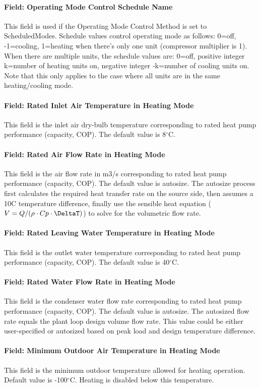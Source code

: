 \paragraph{Field: Operating Mode Control Schedule Name} This field is used if
the Operating Mode Control Method is set to ScheduledModes. Schedule values
control operating mode as follows: 0=off, -1=cooling, 1=heating when there's
only one unit (compressor multiplier is 1). When there are multiple units, the
schedule values are: 0=off, positive integer k=number of heating units on,
negative integer -k=number of cooling units on. Note that this only applies to
the case where all units are in the same heating/cooling mode.
\paragraph{Field: Rated Inlet Air Temperature in Heating Mode} This field is the
inlet air dry-bulb temperature corresponding to rated heat pump performance
(capacity, COP). The default value is 8$^\circ$C.
\paragraph{Field: Rated Air Flow Rate in Heating Mode} This field is the air
flow rate in m3/s corresponding to rated heat pump performance (capacity, COP).
The default value is autosize.
The autosize process first calculates the required heat transfer rate on the source
side, then assumes a 10C temperature difference, finally use the sensible heat
equation ($V = Q / (\rho \cdot Cp \cdot \DeltaT)$) to solve for the volumetric flow rate.
\paragraph{Field: Rated Leaving Water Temperature in Heating Mode} This field is
the outlet water temperature corresponding to rated heat pump performance
(capacity, COP). The default value is 40$^\circ$C.
\paragraph{Field: Rated Water Flow Rate in Heating Mode} This field is the
condenser water flow rate corresponding to rated heat pump performance
(capacity, COP). The default value is autosize.
The autosized flow rate equals the plant loop design volume flow rate. 
This value could be either user-specified or autosized based on peak load and design
temperature difference.
\paragraph{Field: Minimum Outdoor Air Temperature in Heating Mode} This field is
the minimum outdoor temperature allowed for heating operation. Default value is
-100$^\circ$C. Heating is disabled below this temperature.
